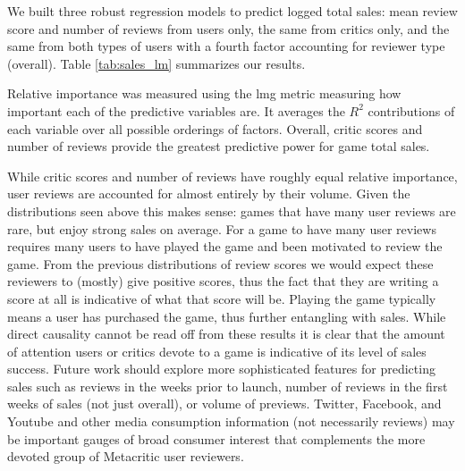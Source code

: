 \documentclass[letterpaper]{article}
\begin{document}
We built three robust regression models to predict logged total sales: mean review score and number of reviews from users only, the same from critics only, and the same from both types of users with a fourth factor accounting for reviewer type (overall). Table \ref{tab:sales_lm} summarizes our results.

\label{tab:sales_lm}

Relative importance was measured using the lmg metric measuring how important each of the predictive variables are. It averages the $R^2$ contributions of each variable over all possible orderings of factors. Overall, critic scores and number of reviews provide the greatest predictive power for game total sales.

While critic scores and number of reviews have roughly equal relative importance, user reviews are accounted for almost entirely by their volume. Given the distributions seen above this makes sense: games that have many user reviews are rare, but enjoy strong sales on average. For a game to have many user reviews requires many users to have played the game and been motivated to review the game. From the previous distributions of review scores we would expect these reviewers to (mostly) give positive scores, thus the fact that they are writing a score at all is indicative of what that score will be. Playing the game typically means a user has purchased the game, thus further entangling with sales. While direct causality cannot be read off from these results it is clear that the amount of attention users or critics devote to a game is indicative of its level of sales success. Future work should explore more sophisticated features for predicting sales such as reviews in the weeks prior to launch, number of reviews in the first weeks of sales (not just overall), or volume of previews. Twitter, Facebook, and Youtube and other media consumption information (not necessarily reviews) may be important gauges of broad consumer interest that complements the more devoted group of Metacritic user reviewers.
\end{document}
